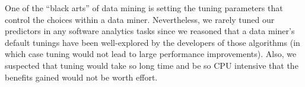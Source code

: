 



One of the ``black arts'' of data mining is setting the tuning
parameters that control the choices within a data miner. 
Nevertheless, we rarely tuned our predictors in
any software analytics tasks since we reasoned that a data miner's default tunings have been 
well-explored by the developers of those algorithms (in which case
tuning would not lead to large performance improvements). Also, we suspected that
tuning would take so long time and be so CPU intensive that the benefits gained would not be worth effort.

